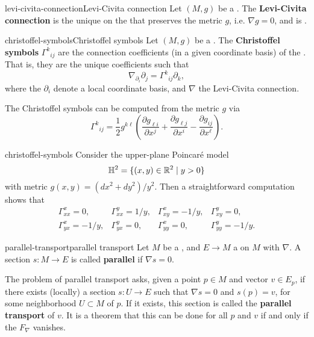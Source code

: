 \begin{topic}{levi-civita-connection}{Levi-Civita connection}
    Let $(M, g)$ be a . The \textbf{Levi-Civita connection} is the unique  on the  that preserves the metric $g$, i.e. $\nabla g = 0$, and is .
\end{topic}

\begin{topic}{christoffel-symbols}{Christoffel symbols}
    Let $(M, g)$ be a . The \textbf{Christoffel symbols} ${\Gamma^k}_{ij}$ are the connection coefficients (in a given coordinate basis) of the . That is, they are the unique coefficients such that
    \[ \nabla_{\partial_i} \partial_j = {\Gamma^k}_{ij} \partial_k , \]
    where the $\partial_i$ denote a local coordinate basis, and $\nabla$ the Levi-Civita connection.
    
    The Christoffel symbols can be computed from the metric $g$ via
    \[ {\Gamma^k}_{ij} = \frac{1}{2} g^{k \ell} \left(\frac{\partial g_{\ell i}}{\partial x^j} + \frac{\partial g_{\ell j}}{\partial x^i} - \frac{\partial g_{ij}}{\partial x^\ell} \right) . \]
\end{topic}

\begin{example}{christoffel-symbols}
    Consider the upper-plane Poincaré model
    \[ \mathbb{H}^2 = \{ (x, y) \in \mathbb{R}^2 \mid y > 0 \}  \]
    with metric $g(x, y) = (dx^2 + dy^2) / y^2$. Then a straightforward computation shows that
    \[ \begin{array}{cccc}
        \Gamma_{xx}^x = 0, & \Gamma_{xx}^y = 1/y, & \Gamma_{xy}^x = -1/y, & \Gamma_{xy}^y = 0, \\
        \Gamma_{yx}^x = -1/y, & \Gamma_{yx}^y = 0, & \Gamma_{yy}^x = 0, & \Gamma_{yy}^y = -1/y .
    \end{array} \]
\end{example}

\begin{topic}{parallel-transport}{parallel transport}
    Let $M$ be a , and $E \to M$ a  on $M$ with  $\nabla$. A section $s \colon M \to E$ is called \textbf{parallel} if $\nabla s = 0$.
    
    The problem of parallel transport asks, given a point $p \in M$ and vector $v \in E_p$, if there exists (locally) a section $s \colon U \to E$ such that $\nabla s = 0$ and $s(p) = v$, for some neighborhood $U \subset M$ of $p$. If it exists, this section is called the \textbf{parallel transport} of $v$. It is a theorem that this can be done for all $p$ and $v$ if and only if the  $F_\nabla$ vanishes.
\end{topic}

